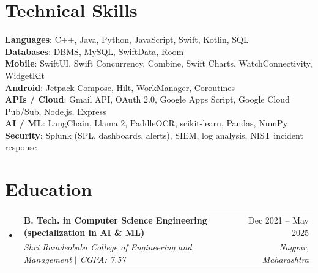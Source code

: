 \documentclass[a4paper,11pt]{article}
\makeatletter
\newcommand{\resumeSubheading}[4]{
  \vspace{-1pt}\item
    \begin{tabularx}{0.97\textwidth}[t]{@{}>{\raggedright\arraybackslash}X@{\hspace{0.75em}}r@{}}
      \textbf{#1} & #2 \\
      \textit{\small#3} & \textit{\small #4} \\
    \end{tabularx}\vspace{-3pt}
}
\newcommand{\resumeSubItemListStart}{\begin{itemize}[leftmargin=0.15in, label={}]}
\newcommand{\resumeSubItemListEnd}{\end{itemize}}
\makeatother
\begin{document}
\section{Technical Skills}
  \begin{itemize}[leftmargin=0.15in, label={}]
    \small{\item{
      \textbf{Languages}{: C++, Java, Python, JavaScript, Swift, Kotlin, SQL} \\
      \textbf{Databases}{: DBMS, MySQL, SwiftData, Room} \\
      \textbf{Mobile}{: SwiftUI, Swift Concurrency, Combine, Swift Charts, WatchConnectivity, WidgetKit} \\
      \textbf{Android}{: Jetpack Compose, Hilt, WorkManager, Coroutines} \\
      \textbf{APIs / Cloud}{: Gmail API, OAuth 2.0, Google Apps Script, Google Cloud Pub/Sub, Node.js, Express} \\
      \textbf{AI / ML}{: LangChain, Llama 2, PaddleOCR, scikit-learn, Pandas, NumPy} \\
      \textbf{Security}{: Splunk (SPL, dashboards, alerts), SIEM, log analysis, NIST incident response}
    }}
  \end{itemize}

\section{Education}
  \resumeSubItemListStart
    \resumeSubheading
      {B. Tech. in Computer Science Engineering (specialization in AI \& ML)}{Dec 2021 -- May 2025}
      {Shri Ramdeobaba College of Engineering and Management $|$ CGPA: 7.57}{Nagpur, Maharashtra}
  \resumeSubItemListEnd
\end{document}
